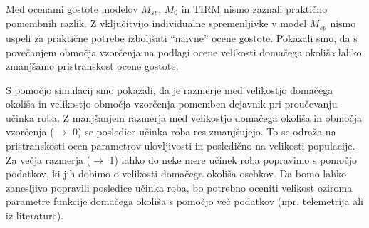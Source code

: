 Med ocenami gostote modelov $M_{sp}$, $M_0$ in TIRM nismo zaznali praktično pomembnih razlik. Z vključitvijo individualne spremenljivke v model $M_{sp}$ nismo uspeli za praktične potrebe izboljšati ``naivne'' ocene gostote. Pokazali smo, da s povečanjem območja vzorčenja na podlagi ocene velikosti domačega okoliša lahko zmanjšamo pristranskost ocene gostote.

S pomočjo simulacij smo pokazali, da je razmerje med velikostjo domačega okoliša in velikostjo območja vzorčenja pomemben dejavnik pri proučevanju učinka roba. Z manjšanjem razmerja med velikostjo domačega okoliša in območja vzorčenja ($\rightarrow$ 0) se posledice učinka roba res zmanjšujejo. To se odraža na pristranskosti ocen parametrov ulovljivosti in posledično na velikosti populacije. Za večja razmerja ($\rightarrow$ 1) lahko do neke mere učinek roba popravimo s pomočjo podatkov, ki jih dobimo o velikosti domačega okoliša osebkov. Da bomo lahko zanesljivo popravili posledice učinka roba, bo potrebno oceniti velikost oziroma parametre funkcije domačega okoliša s pomočjo več podatkov (npr. telemetrija ali iz literature).
